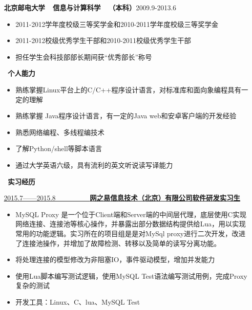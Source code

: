 \documentclass[a4paper,oneside,UTF8, winfonts]{ctexart}
\begin{document}
\indent \textbf{北京邮电大学~~信息与计算科学~~（本科）}\hfill {}2009.9-2013.6
\begin{itemize}[topsep=0.3em, leftmargin=3pc]
  \setlength{\itemsep}{0pt}
  \setlength{\parsep}{4pt}
  \setlength{\parskip}{4pt}
  \item {}2011-2012学年度校级三等奖学金和2010-2011学年度校级三等奖学金
  \item {}2011-2012校级优秀学生干部和2010-2011校级优秀学生干部
  \item {}担任学生会科技部部长期间获“优秀部长”称号
\end{itemize}
\noindent \textbf{ \heiti \faCogs\ 个人能力}
\begin{itemize}[topsep=0.3em, leftmargin=3pc]
  \setlength{\itemsep}{0pt}
  \setlength{\parsep}{4pt}
  \setlength{\parskip}{4pt}
  \item {}熟练掌握Linux平台上的C/C++程序设计语言，对标准库和面向象编程具有一定的理解
  \item {}熟练掌握 Java程序设计语言，有一定的Java web和安卓客户端的开发经验
  \item {}熟悉网络编程、多线程编技术
  \item {}了解Python/shell等脚本语言
  \item {}通过大学英语六级，具有流利的英文听说读写译能力
\end{itemize}
\noindent \textbf{ \heiti \faBriefcase\ 实习经历}\par
\vspace{1.2ex}
\uline{2015.7——2015.8~~~~~~~~~~\bf{网之易信息技术（北京）有限公司}\hfill \bf{软件研发实习生}}
\begin{itemize}[topsep=0.3em, leftmargin=3pc]
  \setlength{\itemsep}{0pt}
  \setlength{\parsep}{4pt}
  \setlength{\parskip}{4pt}
  \item {}MySQL Proxy 是一个位于Client端和Server端的中间层代理，底层使用C实现网络连接、连接池等核心操作，并暴露出部分数据结构提供给Lua，用以实现常用的功能逻辑。实习所在的项目组是是对MySql proxy进行二次开发，改进了连接池操作，并增加了故障检测、转移以及简单的读写分离功能。
  \item {}将处理连接的模型修改为非阻塞IO，事件驱动模型，增加并发能力
  \item {}使用Lua脚本编写测试逻辑，使用MySQL Test语法编写测试用例，完成Proxy复杂的测试
  \item {}开发工具：Linux、C、lua、MySQL Test
\end{itemize}\par
\end{document}
